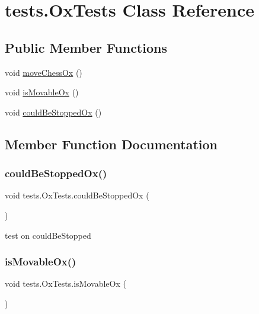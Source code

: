 \hypertarget{classtests_1_1_ox_tests}{}\section{tests.\+Ox\+Tests Class Reference}
\label{classtests_1_1_ox_tests}
\subsection*{Public Member Functions}
\begin{DoxyCompactItemize}
\item 
void \mbox{\hyperlink{classtests_1_1_ox_tests_a240476c2b7dda99ff721574bc2298fc9}{move\+Chess\+Ox}} ()
\item 
void \mbox{\hyperlink{classtests_1_1_ox_tests_a4567fa10ba9a7ecd39a334f80351155b}{is\+Movable\+Ox}} ()
\item 
void \mbox{\hyperlink{classtests_1_1_ox_tests_a67ebfc2f27b464501f96393654d2bbe8}{could\+Be\+Stopped\+Ox}} ()
\end{DoxyCompactItemize}


\subsection{Member Function Documentation}
\mbox{\label{classtests_1_1_ox_tests_a67ebfc2f27b464501f96393654d2bbe8}} 
\subsubsection{\texorpdfstring{could\+Be\+Stopped\+Ox()}{couldBeStoppedOx()}}
{\footnotesize\ttfamily void tests.\+Ox\+Tests.\+could\+Be\+Stopped\+Ox (\begin{DoxyParamCaption}{ }\end{DoxyParamCaption})\hspace{0.3cm}{\ttfamily [inline]}}

test on could\+Be\+Stopped \mbox{\label{classtests_1_1_ox_tests_a4567fa10ba9a7ecd39a334f80351155b}} 
\subsubsection{\texorpdfstring{is\+Movable\+Ox()}{isMovableOx()}}
{\footnotesize\ttfamily void tests.\+Ox\+Tests.\+is\+Movable\+Ox (\begin{DoxyParamCaption}{ }\end{DoxyParamCaption})\hspace{0.3cm}{\ttfamily [inline]}}

